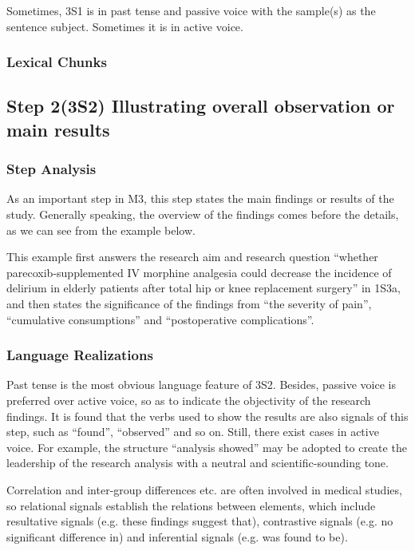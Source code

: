 \documentclass{ctexbook}
\begin{document}
    Sometimes, 3S1 is in past tense and passive voice with the sample(s) as the sentence subject. Sometimes it is in active voice.

    \subsubsection{Lexical Chunks}

  \subsection{Step 2(3S2) Illustrating overall observation or main results}
    \subsubsection{Step Analysis}

    As an important step in M3, this step states the main findings or results of the study. Generally speaking, the overview of the findings comes before the details, as we can see from the example below.

    This example first answers the research aim and research question ``whether parecoxib-supplemented IV morphine analgesia could decrease the incidence of delirium in elderly patients after total hip or knee replacement surgery'' in 1S3a, and then states the significance of the findings from ``the severity of pain'', ``cumulative consumptions'' and ``postoperative complications''.

    \subsubsection{Language Realizations}

    Past tense is the most obvious language feature of 3S2. Besides, passive voice is preferred over active voice, so as to indicate the objectivity of the research findings. It is found that the verbs used to show the results are also signals of this step, such as ``found'', ``observed'' and so on. Still, there exist cases in active voice. For example, the structure ``analysis showed'' may be adopted to create the leadership of the research analysis with a neutral and scientific-sounding tone.

    Correlation and inter-group differences etc. are often involved in medical studies, so relational signals establish the relations between elements, which include resultative signals (e.g. these findings suggest that), contrastive signals (e.g. no significant difference in) and inferential signals (e.g. was found to be).
\end{document}
